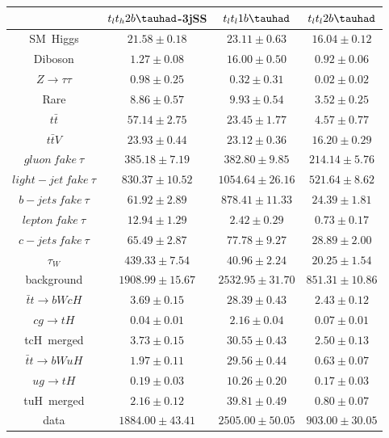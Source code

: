 \centering
\begin{tabular}{cccc} \toprule\toprule
 & $t_lt_h2b\tauhad$-3jSS & $t_lt_l1b\tauhad$ & $t_lt_l2b\tauhad$\\\midrule
\hspace{3mm}SM~Higgs & $21.58\pm0.18$ & $23.11\pm0.63$ & $16.04\pm0.12$\\
\hspace{3mm}Diboson & $1.27\pm0.08$ & $16.00\pm0.50$ & $0.92\pm0.06$\\
\hspace{3mm}$Z\to\tau\tau$ & $0.98\pm0.25$ & $0.32\pm0.31$ & $0.02\pm0.02$\\
\hspace{3mm}Rare & $8.86\pm0.57$ & $9.93\pm0.54$ & $3.52\pm0.25$\\
\hspace{3mm}$t\bar{t}$ & $57.14\pm2.75$ & $23.45\pm1.77$ & $4.57\pm0.77$\\
\hspace{3mm}$t\bar{t}V$ & $23.93\pm0.44$ & $23.12\pm0.36$ & $16.20\pm0.29$\\
\hspace{3mm}$gluon~fake~\tau$ & $385.18\pm7.19$ & $382.80\pm9.85$ & $214.14\pm5.76$\\
\hspace{3mm}$light-jet~fake~\tau$ & $830.37\pm10.52$ & $1054.64\pm26.16$ & $521.64\pm8.62$\\
\hspace{3mm}$b-jets~fake~\tau$ & $61.92\pm2.89$ & $878.41\pm11.33$ & $24.39\pm1.81$\\
\hspace{3mm}$lepton~fake~\tau$ & $12.94\pm1.29$ & $2.42\pm0.29$ & $0.73\pm0.17$\\
\hspace{3mm}$c-jets~fake~\tau$ & $65.49\pm2.87$ & $77.78\pm9.27$ & $28.89\pm2.00$\\
\hspace{3mm}$\tau_{W}$ & $439.33\pm7.54$ & $40.96\pm2.24$ & $20.25\pm1.54$\\
background & $1908.99\pm15.67$ & $2532.95\pm31.70$ & $851.31\pm10.86$\\\midrule
\hspace{3mm}$\bar{t}t\to bWcH$ & $3.69\pm0.15$ & $28.39\pm0.43$ & $2.43\pm0.12$\\
\hspace{3mm}$cg\to tH$ & $0.04\pm0.01$ & $2.16\pm0.04$ & $0.07\pm0.01$\\
tcH~merged & $3.73\pm0.15$ & $30.55\pm0.43$ & $2.50\pm0.13$\\
\hspace{3mm}$\bar{t}t\to bWuH$ & $1.97\pm0.11$ & $29.56\pm0.44$ & $0.63\pm0.07$\\
\hspace{3mm}$ug\to tH$ & $0.19\pm0.03$ & $10.26\pm0.20$ & $0.17\pm0.03$\\
tuH~merged & $2.16\pm0.12$ & $39.81\pm0.49$ & $0.80\pm0.07$\\\midrule
data & $1884.00\pm43.41$ & $2505.00\pm50.05$ & $903.00\pm30.05$\\
\end{tabular}
